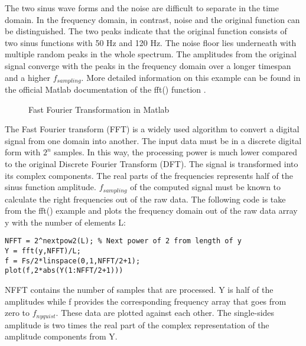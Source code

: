 The two sinus wave forms and the noise are difficult to separate in the time domain. In the frequency domain, in contrast, noise and the original function can be distinguished. The two peaks indicate that the original function consists of two sinus functions with 50 Hz and 120 Hz. The noise floor lies underneath with multiple random peaks in the whole spectrum. The amplitudes from the original signal converge with the peaks in the frequency domain over a longer timespan and a higher $f_{sampling}$. More detailed information on this example can be found in the official Matlab documentation of the fft() function \cite{Matlab_FFT}.

\begin{figure}[!h]
	\hfill
	\caption{Fast Fourier Transformation in Matlab}
	\centering
	\label{fig:FFT_principle} 
\end{figure}

The Fast Fourier transform (FFT) is a widely used algorithm to convert a digital signal from one domain into another. The input data must be in a discrete digital form with $2^n$ samples. In this way, the processing power is much lower compared to the original Discrete Fourier Transform (DFT). The signal is transformed into its complex components. The real parts of the frequencies represents half of the sinus function amplitude. $f_{sampling}$ of the computed signal must be known to calculate the right frequencies out of the raw data. The following code is take from the fft() example and plots the frequency domain out of the raw data array y with the number of elements L:

\begin{lstlisting} 
NFFT = 2^nextpow2(L); % Next power of 2 from length of y
Y = fft(y,NFFT)/L;
f = Fs/2*linspace(0,1,NFFT/2+1);
plot(f,2*abs(Y(1:NFFT/2+1)))
\end{lstlisting} 

NFFT contains the number of samples that are processed. Y is half of the amplitudes while f provides the corresponding frequency array that goes from zero to $f_{nyquist}$. These data are plotted against each other. The single-sides amplitude is two times the real part of the complex representation of the amplitude components from Y.\\
 

